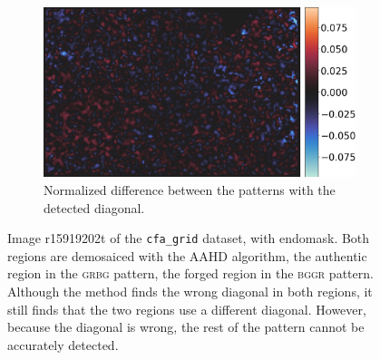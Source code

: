 \documentclass{ipol}
\begin{document}
\begin{figure}[ht]
\begin{subfigure}[t]{.365\linewidth}
                \includegraphics[width=\linewidth]{images/aahd_nodual/out_diff_grid.png}
                \caption{Normalized difference between the patterns with the detected diagonal.}
        \end{subfigure}
        \caption{Image r15919202t of the \texttt{cfa\_grid} dataset, with endomask. Both regions are demosaiced with the AAHD algorithm, the authentic region in the \textsc{grbg} pattern, the forged region in the \textsc{bggr} pattern. Although the method finds the wrong diagonal in both regions, it still finds that the two regions use a different diagonal. However, because the diagonal is wrong, the rest of the pattern cannot be accurately detected.}
\end{figure}
\end{document}

